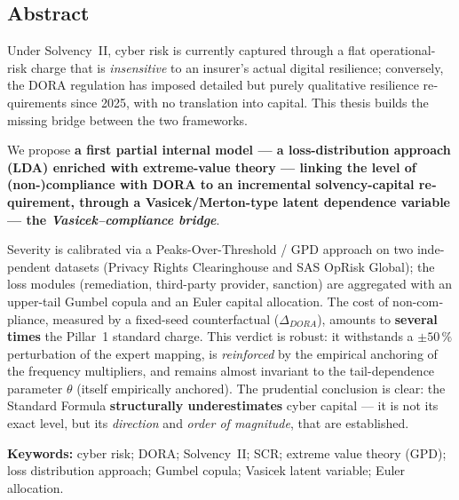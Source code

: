 \documentclass[11pt,a4paper]{article}
\theoremstyle{navystyle}
\theoremstyle{navydef}
\begin{document}
\begin{otherlanguage}{english}
\section*{\color{navy}Abstract}

Under Solvency~II, cyber risk is currently captured through a flat
operational-risk charge that is \emph{insensitive} to an insurer's actual
digital resilience; conversely, the DORA regulation has imposed detailed but
purely qualitative resilience requirements since 2025, with no translation into
capital. This thesis builds the missing bridge between the two frameworks.

\begin{formulekey}[Contribution]
We propose \textbf{a first partial internal model --- a loss-distribution
approach (LDA) enriched with extreme-value theory --- linking the level of
(non-)compliance with DORA to an incremental solvency-capital requirement,
through a Vasicek/Merton-type latent dependence variable --- the
\emph{Vasicek--compliance bridge}}.
\end{formulekey}

\noindent Severity is calibrated via a Peaks-Over-Threshold / GPD approach on
two independent datasets (Privacy Rights Clearinghouse and SAS OpRisk Global);
the loss modules (remediation, third-party provider, sanction) are aggregated
with an upper-tail Gumbel copula and an Euler capital allocation. The cost of
non-compliance, measured by a fixed-seed counterfactual ($\Delta_{DORA}$),
amounts to \textbf{several times} the Pillar~1 standard charge. This verdict is
robust: it withstands a $\pm50\,\%$ perturbation of the expert mapping, is
\emph{reinforced} by the empirical anchoring of the frequency multipliers, and
remains almost invariant to the tail-dependence parameter $\theta$ (itself
empirically anchored). The prudential conclusion is clear: the Standard Formula
\textbf{structurally underestimates} cyber capital --- it is not its exact
level, but its \emph{direction} and \emph{order of magnitude}, that are
established.

\medskip
\noindent\textbf{Keywords:} cyber risk; DORA; Solvency~II; SCR; extreme value
theory (GPD); loss distribution approach; Gumbel copula; Vasicek latent
variable; Euler allocation.
\end{otherlanguage}

\begingroup
\hypersetup{linkcolor=navy}
\renewcommand{\contentsname}{\color{navy}Sommaire}
\setcounter{tocdepth}{2}   %
\tableofcontents
\endgroup
\thispagestyle{fancy}
\clearpage
\end{document}
